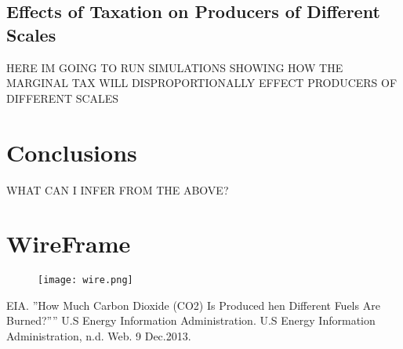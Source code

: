 \documentclass{article}
\begin{document}
\subsection{Effects of Taxation on Producers of Different Scales}
HERE IM GOING TO RUN SIMULATIONS SHOWING HOW THE MARGINAL TAX WILL DISPROPORTIONALLY EFFECT PRODUCERS OF DIFFERENT SCALES

\section{Conclusions}
WHAT CAN I INFER FROM THE ABOVE?

\newpage
\appendix

	\section{WireFrame}

		\begin{figure}[ht!]
			\begin{center}
			\texttt{[image: wire.png]}
			\end{center}
		\end{figure}






\newpage

\begin{thebibliography}{1}

	 EIA. ”How Much Carbon Dioxide (CO2) Is Produced hen Different Fuels Are Burned?”” U.S Energy Information Administration. U.S Energy Information Administration, n.d. Web. 9 Dec.2013.



\end{thebibliography}
\end{document}
